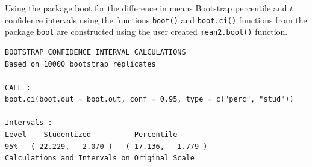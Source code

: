 \documentclass[
  ignorenonframetext,
]{beamer}
\newenvironment{Shaded}{\begin{snugshade}}{\end{snugshade}}
\newcommand{\AttributeTok}[1]{\textcolor[rgb]{0.13,0.29,0.53}{#1}}
\newcommand{\ControlFlowTok}[1]{\textcolor[rgb]{0.13,0.29,0.53}{\textbf{#1}}}
\newcommand{\DecValTok}[1]{\textcolor[rgb]{0.00,0.00,0.81}{#1}}
\newcommand{\FloatTok}[1]{\textcolor[rgb]{0.00,0.00,0.81}{#1}}
\newcommand{\FunctionTok}[1]{\textcolor[rgb]{0.13,0.29,0.53}{\textbf{#1}}}
\newcommand{\NormalTok}[1]{#1}
\newcommand{\OtherTok}[1]{\textcolor[rgb]{0.56,0.35,0.01}{#1}}
\newcommand{\SpecialCharTok}[1]{\textcolor[rgb]{0.81,0.36,0.00}{\textbf{#1}}}
\newcommand{\StringTok}[1]{\textcolor[rgb]{0.31,0.60,0.02}{#1}}
\begin{document}
\begin{frame}[fragile]{Using the package boot for the difference in
means}
\protect\hypertarget{using-the-package-boot-for-the-difference-in-means}{}
Bootstrap percentile and \(t\) confidence intervals using the functions
\texttt{boot()} and \texttt{boot.ci()} functions from the package
\texttt{boot} are constructed using the user created
\texttt{mean2.boot()} function.

\tiny

\begin{Shaded}
\end{Shaded}

\begin{verbatim}
BOOTSTRAP CONFIDENCE INTERVAL CALCULATIONS
Based on 10000 bootstrap replicates

CALL : 
boot.ci(boot.out = boot.out, conf = 0.95, type = c("perc", "stud"))

Intervals : 
Level    Studentized          Percentile     
95%   (-22.229,  -2.070 )   (-17.136,  -1.779 )  
Calculations and Intervals on Original Scale
\end{verbatim}

\normalsize
\end{frame}
\end{document}
